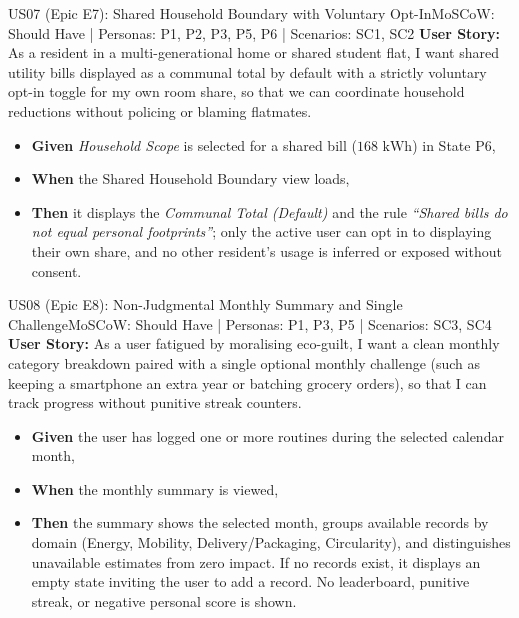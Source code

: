 \documentclass[12pt, a4paper]{article}
\begin{document}
\begin{storybox}{US07 (Epic E7): Shared Household Boundary with Voluntary Opt-In}{MoSCoW: Should Have | Personas: P1, P2, P3, P5, P6 | Scenarios: SC1, SC2}
\textbf{User Story:} As a resident in a multi-generational home or shared student flat, I want shared utility bills displayed as a communal total by default with a strictly voluntary opt-in toggle for my own room share, so that we can coordinate household reductions without policing or blaming flatmates.
\begin{itemize}
    \item \textbf{Given} \textit{Household Scope} is selected for a shared bill ($168\text{ kWh}$) in State P6,
    \item \textbf{When} the Shared Household Boundary view loads,
    \item \textbf{Then} it displays the \textit{Communal Total (Default)} and the rule \textit{``Shared bills do not equal personal footprints''}; only the active user can opt in to displaying their own share, and no other resident's usage is inferred or exposed without consent.
\end{itemize}
\end{storybox}

\begin{storybox}{US08 (Epic E8): Non-Judgmental Monthly Summary and Single Challenge}{MoSCoW: Should Have | Personas: P1, P3, P5 | Scenarios: SC3, SC4}
\textbf{User Story:} As a user fatigued by moralising eco-guilt, I want a clean monthly category breakdown paired with a single optional monthly challenge (such as keeping a smartphone an extra year or batching grocery orders), so that I can track progress without punitive streak counters.
\begin{itemize}
    \item \textbf{Given} the user has logged one or more routines during the selected calendar month,
    \item \textbf{When} the monthly summary is viewed,
    \item \textbf{Then} the summary shows the selected month, groups available records by domain (Energy, Mobility, Delivery/Packaging, Circularity), and distinguishes unavailable estimates from zero impact. If no records exist, it displays an empty state inviting the user to add a record. No leaderboard, punitive streak, or negative personal score is shown.
\end{itemize}
\end{storybox}
\end{document}
